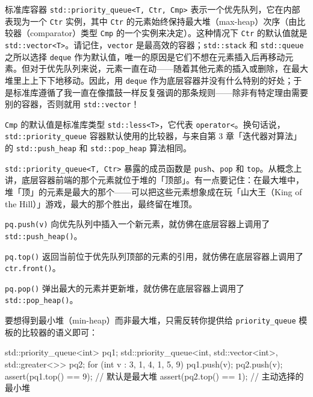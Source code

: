 标准库容器 \texttt{std::\allowbreak{}priority\_\allowbreak{}queue<\allowbreak{}T,\allowbreak{} Ctr,\allowbreak{} Cmp>\allowbreak{}} 表示一个优先队列，它在内部表现为一个 \texttt{Ctr} 实例，其中 \texttt{Ctr} 的元素始终保持最大堆（max-heap）次序（由比较器（comparator）类型 \texttt{Cmp} 的一个实例来决定）。这种情况下 \texttt{Ctr} 的默认值就是 \texttt{std::\allowbreak{}vector<\allowbreak{}T>\allowbreak{}}。请记住，\texttt{vector} 是最高效的容器；\texttt{std::\allowbreak{}stack} 和 \texttt{std::\allowbreak{}queue} 之所以选择 \texttt{deque} 作为默认值，唯一的原因是它们不想在元素插入后再移动元素。但对于优先队列来说，元素一直在动——随着其他元素的插入或删除，在最大堆里上上下下地移动。因此，用 \texttt{deque} 作为底层容器并没有什么特别的好处；于是标准库遵循了我一直在像擂鼓一样反复强调的那条规则——除非有特定理由需要别的容器，否则就用 \texttt{std::\allowbreak{}vector}！

\texttt{Cmp} 的默认值是标准库类型 \texttt{std::\allowbreak{}less<\allowbreak{}T>\allowbreak{}}，它代表 \texttt{operator<}。换句话说，\texttt{std::\allowbreak{}priority\_\allowbreak{}queue} 容器默认使用的比较器，与来自第 3 章「迭代器对算法」的 \texttt{std::\allowbreak{}push\_\allowbreak{}heap} 和 \texttt{std::\allowbreak{}pop\_\allowbreak{}heap} 算法相同。

\texttt{std::\allowbreak{}priority\_\allowbreak{}queue<\allowbreak{}T,\allowbreak{} Ctr>\allowbreak{}} 暴露的成员函数是 \texttt{push}、\texttt{pop} 和 \texttt{top}。从概念上讲，底层容器前端的那个元素就位于堆的「顶部」。有一点要记住：在最大堆中，堆「顶」的元素是最大的那个——可以把这些元素想象成在玩「山大王（King of the Hill）」游戏，最大的那个胜出，最终留在堆顶。

\texttt{pq.\allowbreak{}push(\allowbreak{}v)\allowbreak{}} 向优先队列中插入一个新元素，就仿佛在底层容器上调用了 \texttt{std::\allowbreak{}push\_\allowbreak{}heap(\allowbreak{})\allowbreak{}}。

\texttt{pq.\allowbreak{}top(\allowbreak{})\allowbreak{}} 返回当前位于优先队列顶部的元素的引用，就仿佛在底层容器上调用了 \texttt{ctr.\allowbreak{}front(\allowbreak{})\allowbreak{}}。

\texttt{pq.\allowbreak{}pop(\allowbreak{})\allowbreak{}} 弹出最大的元素并更新堆，就仿佛在底层容器上调用了 \texttt{std::\allowbreak{}pop\_\allowbreak{}heap(\allowbreak{})\allowbreak{}}。

要想得到最小堆（min-heap）而非最大堆，只需反转你提供给 \texttt{priority\_\allowbreak{}queue} 模板的比较器的语义即可：

\begin{codebox}[cpp]
    std::priority_queue<int> pq1;
    std::priority_queue<int, std::vector<int>, std::greater<>> pq2;
    for (int v : {3, 1, 4, 1, 5, 9}) {
      pq1.push(v);
      pq2.push(v);
    }
    assert(pq1.top() == 9); // 默认是最大堆
    assert(pq2.top() == 1); // 主动选择的最小堆
\end{codebox}

